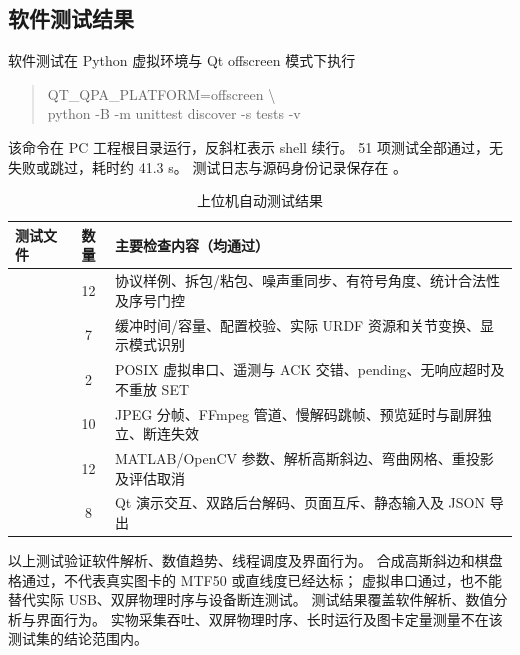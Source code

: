 \subsection{软件测试结果}
软件测试在 Python 虚拟环境与 Qt offscreen 模式下执行
\begin{quote}\small\ttfamily
QT\_QPA\_PLATFORM=offscreen \textbackslash{}\\
python -B -m unittest discover -s tests -v
\end{quote}
该命令在 PC 工程根目录运行，反斜杠表示 shell 续行。
51 项测试全部通过，无失败或跳过，耗时约 41.3 s。
测试日志与源码身份记录保存在 。

\begin{table}[htbp]\centering\small
\caption{上位机自动测试结果}\label{tab:app-host-tests}
\begin{tabularx}{\textwidth}{>{\raggedright\arraybackslash}p{3.0cm}cY}
\toprule
测试文件 & 数量 & 主要检查内容（均通过） \\
\midrule
{} & 12 & 协议样例、拆包/粘包、噪声重同步、有符号角度、统计合法性及序号门控 \\
 & 7 & 缓冲时间/容量、配置校验、实际 URDF 资源和关节变换、显示模式识别 \\
 & 2 & POSIX 虚拟串口、遥测与 ACK 交错、pending、无响应超时及不重放 SET \\
 & 10 & JPEG 分帧、FFmpeg 管道、慢解码跳帧、预览延时与副屏独立、断连失效 \\
 & 12 & MATLAB/OpenCV 参数、解析高斯斜边、弯曲网格、重投影及评估取消 \\
 & 8 & Qt 演示交互、双路后台解码、页面互斥、静态输入及 JSON 导出 \\
\bottomrule
\end{tabularx}
\end{table}

以上测试验证软件解析、数值趋势、线程调度及界面行为。
合成高斯斜边和棋盘格通过，不代表真实图卡的 MTF50 或直线度已经达标；
虚拟串口通过，也不能替代实际 USB、双屏物理时序与设备断连测试。
测试结果覆盖软件解析、数值分析与界面行为。
实物采集吞吐、双屏物理时序、长时运行及图卡定量测量不在该测试集的结论范围内。
